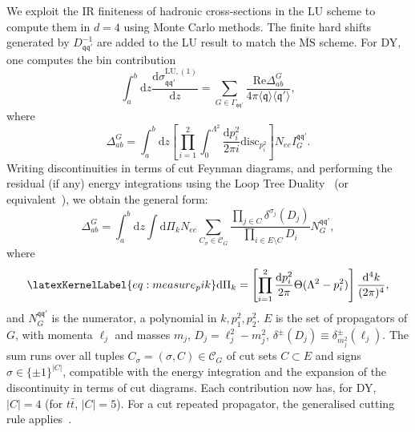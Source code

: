 \documentclass[%
 reprint,
 amsmath,amssymb,
 superscriptaddress,
 aps,
 preprintnumbers,
prl,
floatfix,
]{revtex4-2}
\let\label\latexKernelLabel
\begin{document}
We exploit the IR finiteness of hadronic cross-sections in the $\text{LU}$ scheme to compute them in $d=4$ using Monte Carlo methods.
The finite hard shifts generated by $D^{-1}_{\mathfrak{q}\mathfrak{q}'}$ are added to the LU result to match the $\overline{\text{MS}}$ scheme.
For DY, one computes the bin contribution
\begin{equation}
\int_a^b \mathrm{d}z\frac{\mathrm{d}\sigma_{\mathfrak{q}\mathfrak{q}'}^{\text{LU},(1)}}{\mathrm{d}z}=\sum_{G\in\Gamma_{\mathfrak{q}\mathfrak{q}'}}\frac{\text{Re}\Delta_{ab}^G}{4\pi \langle\mathfrak{q}\rangle \langle\mathfrak{q}'\rangle},
\end{equation}
where
\begin{equation}
\Delta_{ab}^G=\! \int_a^b \mathrm{d}z\left[\prod_{i=1}^2\int_0^{\Lambda^2}\frac{\mathrm{d}p_i^2}{2\pi i}\text{disc}_{p_i^2}\right] \! N_{ee}I_{ G}^{\mathfrak{q}\mathfrak{q}'}.
\end{equation}
Writing discontinuities in terms of cut Feynman diagrams, and performing the residual (if any) energy integrations using the Loop Tree Duality~\cite{Catani:2008xa,Bierenbaum:2010cy,PhysRevLett.122.111603,Capatti:2019ypt} (or equivalent~\cite{JesusAguilera-Verdugo:2020fsn,Capatti:2020ytd,Capatti:2022mly,bobadilla2021lottylooptreeduality,Capatti:2023shz,Sborlini_2021}), we obtain the general form:
\begin{equation}
\Delta_{ab}^G=\! \int_{a}^b \mathrm{d}z\int\mathrm{d}\Pi_k N_{ee}\sum_{C_\sigma\in\mathcal{C}_G} \frac{\prod_{j\in C} \delta^{\sigma_j}(D_j)}{\prod_{i\in E\setminus C }D_i}N^{\mathfrak{q}\mathfrak{q}'}_G,
\end{equation}
where
\begin{equation}
\label{eq:measure_pik}
\mathrm{d}\Pi_k=\left[\prod_{i=1}^2\frac{\mathrm{d}p_i^2}{2\pi}\Theta(\Lambda^2-p_i^2)\right]\frac{\mathrm{d}^4 k}{(2\pi)^4},
\end{equation}
and $N^{\mathfrak{q}\mathfrak{q}'}_G$ is the numerator, a polynomial in $k, p_1^2, p_2^2$. $E$ is the set of propagators of $G$, with momenta $\ell_j$ and masses $m_j$, $D_j=\ell_j^2-m_j^2$, $\delta^{\pm}(D_j)\equiv\delta^{\pm}_{m_j^2}(\ell_j)$.
The sum runs over all tuples $C_\sigma=(\sigma,C)\in\mathcal{C}_G$ of cut sets $C\subset E$ and signs $\sigma\in\{\pm 1\}^{|C|}$, compatible with the energy integration and the expansion of the discontinuity in terms of cut diagrams.
Each contribution now has, for DY, $|C|=4$ (for $t\bar{t}$, $|C|=5$).
For a cut repeated propagator, the generalised cutting rule applies~\cite{Capatti:2022tit}.
\end{document}
